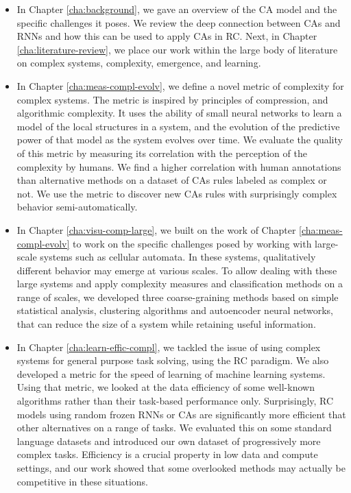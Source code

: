 \begin{itemize}
  \item In Chapter \ref{cha:background}, we gave an overview of the \acf{CA}
        model and the specific challenges it poses. We review the deep
        connection between \acp{CA} and \acfp{RNN} and how this can be used to apply
        \acp{CA} in \acf{RC}. Next, in Chapter \ref{cha:literature-review}, we
        place our work within the large body of literature on complex systems,
        complexity, emergence, and learning.

  \item In Chapter \ref{cha:meas-compl-evolv}, we define a novel metric of
        complexity for complex systems. The metric is inspired by principles of
        compression, and algorithmic complexity. It uses the ability of small
        neural networks to learn a model of the local structures in a system,
        and the evolution of the predictive power of that model as the system
        evolves over time. We evaluate the quality of this metric by measuring
        its correlation with the perception of the complexity by humans. We find a
        higher correlation with human annotations than alternative methods on a
        dataset of \acp{CA} rules labeled as complex or not. We use the metric
        to discover new \acp{CA} rules with surprisingly complex behavior
        semi-automatically.

  \item In Chapter \ref{cha:visu-comp-large}, we built on the work of Chapter
        \ref{cha:meas-compl-evolv} to work on the specific challenges posed by
        working with large-scale systems such as cellular automata. In these
        systems, qualitatively different behavior may emerge at various scales.
        To allow dealing with these large systems and apply complexity measures
        and classification methods on a range of scales, we developed three
        coarse-graining methods based on simple statistical analysis, clustering
        algorithms and autoencoder neural networks, that can reduce the size of
        a system while retaining useful information.

  \item In Chapter \ref{cha:learn-effic-compl}, we tackled the issue of using
        complex systems for general purpose task solving, using the \ac{RC}
        paradigm. We also developed a metric for the speed of learning of
        machine learning systems. Using that metric, we looked at the data
        efficiency of some well-known algorithms rather than their task-based
        performance only. Surprisingly, \ac{RC} models using random frozen
        \acp{RNN} or \acp{CA} are significantly more efficient that other
        alternatives on a range of tasks. We evaluated this on some standard
        language datasets and introduced our own dataset of progressively more
        complex tasks. Efficiency is a crucial property in low data and compute
        settings, and our work showed that some overlooked methods may actually
        be competitive in these situations.
\end{itemize}
